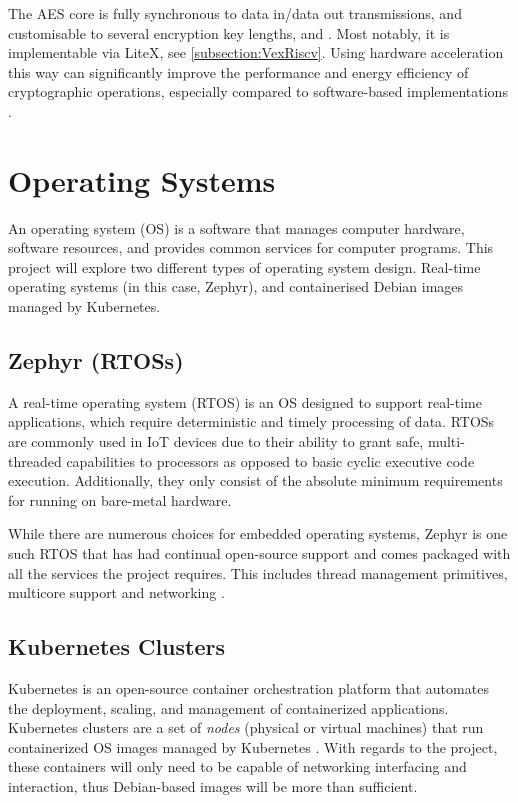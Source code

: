 The AES core is fully synchronous to data in/data out transmissions, and customisable to several encryption key lengths, and . Most notably, it is implementable via LiteX, see \ref{subsection:VexRiscv}. Using hardware acceleration this way can significantly improve the performance and energy efficiency of cryptographic operations, especially compared to software-based implementations \cite{Stallings2019}.

\section{Operating Systems}
An operating system (OS) is a software that manages computer hardware, software resources, and provides common services for computer programs. This project will explore two different types of operating system design. Real-time operating systems (in this case, Zephyr), and containerised Debian images managed by Kubernetes. 

\subsection{Zephyr (RTOSs)}
A real-time operating system (RTOS) is an OS designed to support real-time applications, which require deterministic and timely processing of data. RTOSs are commonly used in IoT devices due to their ability to grant safe, multi-threaded capabilities to processors as opposed to basic cyclic executive code execution. Additionally, they only consist of the absolute minimum requirements for running on bare-metal hardware.

While there are numerous choices for embedded operating systems, Zephyr is one such RTOS that has had continual open-source support and comes packaged with all the services the project requires. This includes thread management primitives, multicore support and networking \cite{ZephyrProject}.

\subsection{Kubernetes Clusters}
Kubernetes is an open-source container orchestration platform that automates the deployment, scaling, and management of containerized applications. Kubernetes clusters are a set of \textit{nodes} (physical or virtual machines) that run containerized OS images managed by Kubernetes \cite{Burns2019}. With regards to the project, these containers will only need to be capable of networking interfacing and interaction, thus Debian-based images will be more than sufficient.

